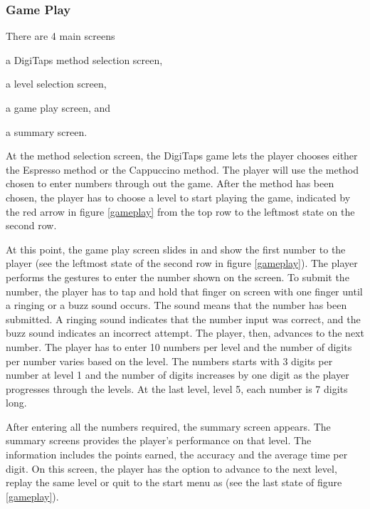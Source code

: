 \subsubsection{Game Play}
There are 4 main screens
    \begin{enumerate*}[(1) ]
      \item a DigiTaps method selection screen, 
      \item a level selection screen, 
      \item a game play screen, and
      \item a summary screen.
    \end{enumerate*}
    At the method selection screen, the DigiTaps game lets the player chooses either the Espresso method or the Cappuccino method. The player will use the method chosen to enter numbers through out the game. After the method has been chosen, the player has to choose a level to start playing the game, indicated by the red arrow in figure \ref{gameplay} from the top row to the leftmost state on the second row.
\par    
At this point, the game play screen slides in and show the first number to the player (see the leftmost state of the second row in figure \ref{gameplay}). The player performs the gestures to enter the number shown on the screen. To submit the number, the player has to tap and hold that finger on screen with one finger until a ringing or a buzz sound occurs. The sound means that the number has been submitted. A ringing sound indicates that the number input was correct, and the buzz sound indicates an incorrect attempt. The player, then, advances to the next number. The player has to enter 10 numbers per level and the number of digits per number varies based on the level. The numbers starts with 3 digits per number at level 1 and the number of digits increases by one digit as the player progresses through the levels. At the last level, level 5, each number is 7 digits long.
\par
After entering all the numbers required, the summary screen appears. The summary screens provides the player's performance on that level. The information includes the points earned, the accuracy and the average time per digit. On this screen, the player has the option to advance to the next level, replay the same level or quit to the start menu as (see the last state of figure \ref{gameplay}).

